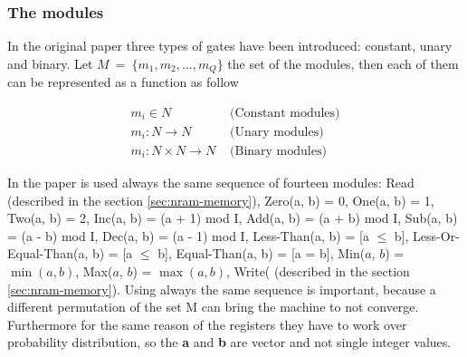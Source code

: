 \subsubsection*{The modules}
In the original paper three types of gates have been introduced: constant, unary and binary. Let $M\ =\ \{m_1, m_2, \dots, m_Q \}$ the set of the modules, then each of them can be represented as a function as follow
\begin{center}
	\begin{equation}
		\begin{split}		
			m_i \in N & \textrm{ (Constant modules)} \\
			m_i: N \rightarrow N & \textrm{ (Unary modules)} \\
			m_i: N \times N \rightarrow N & \textrm{ (Binary modules)}
		\end{split}
	\end{equation}
\end{center}
In the paper is used always the same sequence of fourteen modules: Read (described in the section \ref{sec:nram-memory}), Zero(a, b) = 0, One(a, b) = 1, Two(a, b) = 2, Inc(a, b) = (a + 1) mod I, Add(a, b) = (a + b) mod I, Sub(a, b) = (a - b) mod I, Dec(a, b) = (a - 1) mod I, Less-Than(a, b) = [a $\le$ b], Less-Or-Equal-Than(a, b) = [a $\leq$ b], Equal-Than(a, b) = [a = b], Min($a$, $b$) = $\min(a, b)$, Max($a$, $b$) = $\max(a, b)$, Write( (described in the section \ref{sec:nram-memory}). Using always the same sequence is important, because a different permutation of the set M can bring the machine to not converge. Furthermore for the same reason of the registers they have to work over probability distribution, so the \textbf{a} and \textbf{b} are vector and not single integer values.

